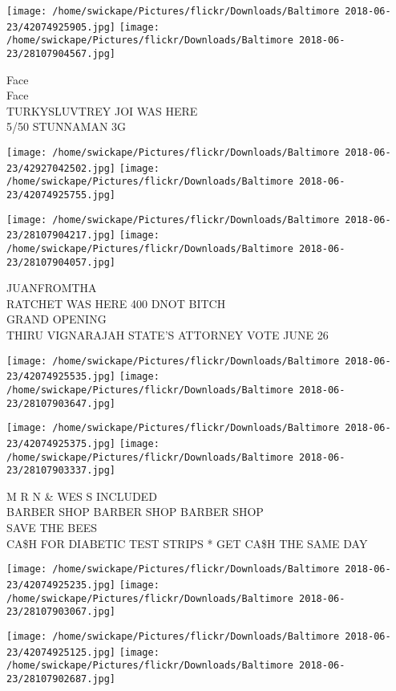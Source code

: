 \documentclass[10pt,letterpaper]{article}
\begin{document}
\texttt{[image: /home/swickape/Pictures/flickr/Downloads/Baltimore 2018-06-23/42074925905.jpg]}
\texttt{[image: /home/swickape/Pictures/flickr/Downloads/Baltimore 2018-06-23/28107904567.jpg]}

Face\\
Face\\
TURKYSLUVTREY JOI WAS HERE\\
5/50 STUNNAMAN 3G
\pagebreak

\texttt{[image: /home/swickape/Pictures/flickr/Downloads/Baltimore 2018-06-23/42927042502.jpg]}
\texttt{[image: /home/swickape/Pictures/flickr/Downloads/Baltimore 2018-06-23/42074925755.jpg]}

\texttt{[image: /home/swickape/Pictures/flickr/Downloads/Baltimore 2018-06-23/28107904217.jpg]}
\texttt{[image: /home/swickape/Pictures/flickr/Downloads/Baltimore 2018-06-23/28107904057.jpg]}

JUANFROMTHA\\
RATCHET WAS HERE 400 DNOT BITCH\\
GRAND OPENING\\
THIRU VIGNARAJAH STATE'S ATTORNEY VOTE JUNE 26
\pagebreak

\texttt{[image: /home/swickape/Pictures/flickr/Downloads/Baltimore 2018-06-23/42074925535.jpg]}
\texttt{[image: /home/swickape/Pictures/flickr/Downloads/Baltimore 2018-06-23/28107903647.jpg]}

\texttt{[image: /home/swickape/Pictures/flickr/Downloads/Baltimore 2018-06-23/42074925375.jpg]}
\texttt{[image: /home/swickape/Pictures/flickr/Downloads/Baltimore 2018-06-23/28107903337.jpg]}

M R N \& WES S INCLUDED\\
BARBER SHOP BARBER SHOP BARBER SHOP\\
SAVE THE BEES\\
CA\$H FOR DIABETIC TEST STRIPS * GET CA\$H THE SAME DAY
\pagebreak

\texttt{[image: /home/swickape/Pictures/flickr/Downloads/Baltimore 2018-06-23/42074925235.jpg]}
\texttt{[image: /home/swickape/Pictures/flickr/Downloads/Baltimore 2018-06-23/28107903067.jpg]}

\texttt{[image: /home/swickape/Pictures/flickr/Downloads/Baltimore 2018-06-23/42074925125.jpg]}
\texttt{[image: /home/swickape/Pictures/flickr/Downloads/Baltimore 2018-06-23/28107902687.jpg]}
\end{document}
